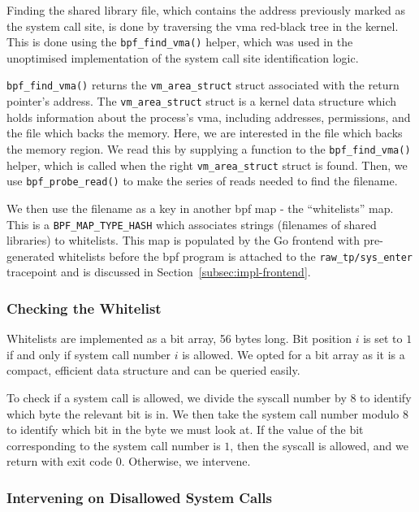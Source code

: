 Finding the shared library file, which contains the address previously marked as
the system call site, is done by traversing the \ac{vma} red-black tree in the
kernel. This is done using the \texttt{bpf\_find\_vma()} helper, which was used
in the unoptimised implementation of the system call site identification logic.

\texttt{bpf\_find\_vma()} returns the \texttt{vm\_area\_struct} struct associated with the
return pointer's address. The \texttt{vm\_area\_struct} struct is a kernel data structure
which holds information about the process's \ac{vma}, including addresses,
permissions, and the file which backs the memory. Here, we are interested in the
file which backs the memory region. We read this by supplying a function
to the \texttt{bpf\_find\_vma()} helper, which is called when the right
\texttt{vm\_area\_struct} struct is found. Then, we use \texttt{bpf\_probe\_read()} to make
the series of reads needed to find the filename.

We then use the filename as a key in another \ac{bpf} map - the ``whitelists''
map. This is a \texttt{BPF\_MAP\_TYPE\_HASH} which associates strings (filenames
of shared libraries) to whitelists. This map is populated by the Go frontend
with pre-generated whitelists before the \ac{bpf} program is attached to the 
\texttt{raw\_tp/sys\_enter} tracepoint and is discussed in 
Section~\ref{subsec:impl-frontend}.

\subsubsection{Checking the Whitelist}

Whitelists are implemented as a bit array, 56 bytes long. Bit position $i$ is
set to $1$ if and only if system call number $i$ is allowed. We opted for a bit
array as it is a compact, efficient data structure and can be queried easily.

To check if a system call is allowed, we divide the syscall number by 8 to identify  
which byte the relevant bit is in. We then take the system call number modulo 8 to
identify which bit in the byte we must look at. If the value of the bit
corresponding to the system call number is $1$, then the syscall is allowed, and we
return with exit code 0. Otherwise, we intervene.

\subsubsection{Intervening on Disallowed System Calls}\label{subsubsec:impl-intervening}

